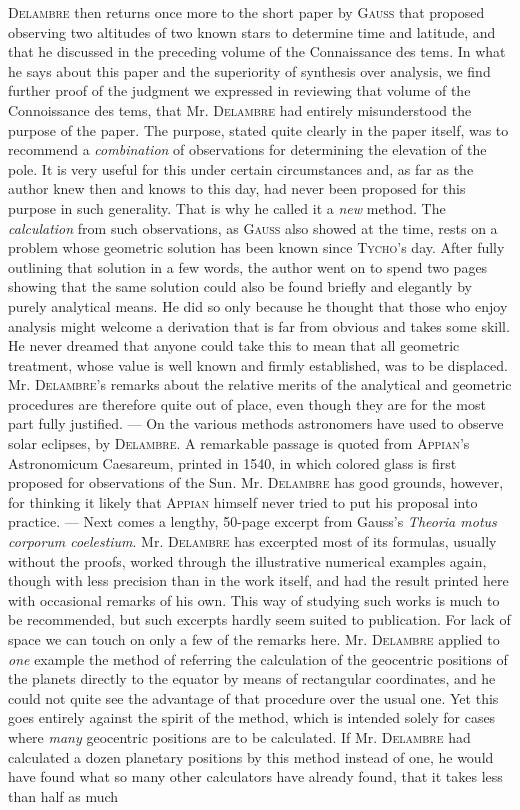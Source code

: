 \textsc{Delambre} then returns once more to the short paper by \textsc{Gauss} that proposed observing two altitudes of two known stars to determine time and latitude, and that he discussed in the preceding volume of the Connaissance des tems. In what he says about this paper and the superiority of synthesis over analysis, we find further proof of the judgment we expressed in reviewing that volume of the Connoissance des tems, that Mr. \textsc{Delambre} had entirely misunderstood the purpose of the paper. The purpose, stated quite clearly in the paper itself, was to recommend a \emph{combination} of observations for determining the elevation of the pole. It is very useful for this under certain circumstances and, as far as the author knew then and knows to this day, had never been proposed for this purpose in such generality. That is why he called it a \emph{new} method. The \emph{calculation} from such observations, as \textsc{Gauss} also showed at the time, rests on a problem whose geometric solution has been known since \textsc{Tycho}'s day. After fully outlining that solution in a few words, the author went on to spend two pages showing that the same solution could also be found briefly and elegantly by purely analytical means. He did so only because he thought that those who enjoy analysis might welcome a derivation that is far from obvious and takes some skill. He never dreamed that anyone could take this to mean that all geometric treatment, whose value is well known and firmly established, was to be displaced. Mr. \textsc{Delambre}'s remarks about the relative merits of the analytical and geometric procedures are therefore quite out of place, even though they are for the most part fully justified. --- On the various methods astronomers have used to observe solar eclipses, by \textsc{Delambre}. A remarkable passage is quoted from \textsc{Appian}'s Astronomicum Caesareum, printed in 1540, in which colored glass is first proposed for observations of the Sun. Mr. \textsc{Delambre} has good grounds, however, for thinking it likely that \textsc{Appian} himself never tried to put his proposal into practice. --- Next comes a lengthy, 50-page excerpt from Gauss's \emph{Theoria motus corporum coelestium}. Mr. \textsc{Delambre} has excerpted most of its formulas, usually without the proofs, worked through the illustrative numerical examples again, though with less precision than in the work itself, and had the result printed here with occasional remarks of his own. This way of studying such works is much to be recommended, but such excerpts hardly seem suited to publication. For lack of space we can touch on only a few of the remarks here. Mr. \textsc{Delambre} applied to \emph{one} example the method of referring the calculation of the geocentric positions of the planets directly to the equator by means of rectangular coordinates, and he could not quite see the advantage of that procedure over the usual one. Yet this goes entirely against the spirit of the method, which is intended solely for cases where \emph{many} geocentric positions are to be calculated. If Mr. \textsc{Delambre} had calculated a dozen planetary positions by this method instead of one, he would have found what so many other calculators have already found, that it takes less than half as much 